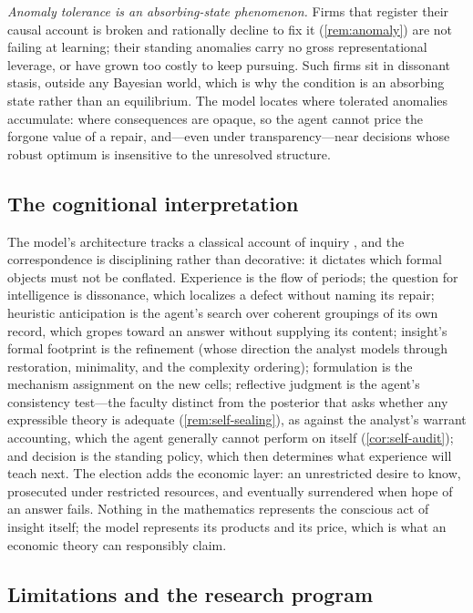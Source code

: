 \documentclass[11pt]{article}
\theoremstyle{definition}
\begin{document}
\emph{Anomaly tolerance is an absorbing-state phenomenon.}
Firms that register their causal account is broken and rationally decline to fix it (\cref{rem:anomaly}) are not failing at learning; their standing anomalies carry no gross representational leverage, or have grown too costly to keep pursuing.
Such firms sit in dissonant stasis, outside any Bayesian world, which is why the condition is an absorbing state rather than an equilibrium.
The model locates where tolerated anomalies accumulate: where consequences are opaque, so the agent cannot price the forgone value of a repair, and---even under transparency---near decisions whose robust optimum is insensitive to the unresolved structure.

\subsection{The cognitional interpretation}

The model's architecture tracks a classical account of inquiry \citep{Lonergan1992,RyallWilkins2018}, and the correspondence is disciplining rather than decorative: it dictates which formal objects must not be conflated.
Experience is the flow of periods; the question for intelligence is dissonance, which localizes a defect without naming its repair; heuristic anticipation is the agent's search over coherent groupings of its own record, which gropes toward an answer without supplying its content; insight's formal footprint is the refinement (whose direction the analyst models through restoration, minimality, and the complexity ordering); formulation is the mechanism assignment on the new cells; reflective judgment is the agent's consistency test---the faculty distinct from the posterior that asks whether any expressible theory is adequate (\cref{rem:self-sealing}), as against the analyst's warrant accounting, which the agent generally cannot perform on itself (\cref{cor:self-audit}); and decision is the standing policy, which then determines what experience will teach next.
The election adds the economic layer: an unrestricted desire to know, prosecuted under restricted resources, and eventually surrendered when hope of an answer fails.
Nothing in the mathematics represents the conscious act of insight itself; the model represents its products and its price, which is what an economic theory can responsibly claim.

\subsection{Limitations and the research program}
\end{document}

